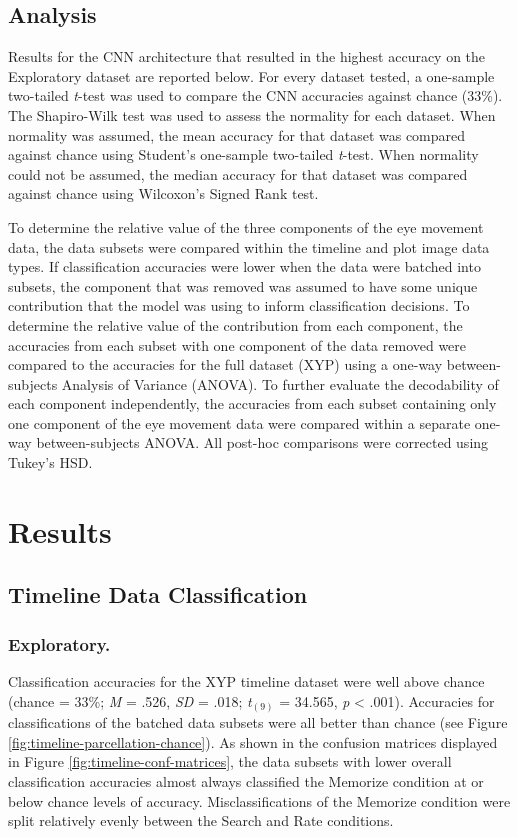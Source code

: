 \documentclass[
  english,
  man,floatsintext]{apa6}
\begin{document}
\subsection{Analysis}

Results for the CNN architecture that resulted in the highest accuracy on the Exploratory dataset are reported below. For every dataset tested, a one-sample two-tailed \emph{t}-test was used to compare the CNN accuracies against chance (33\%). The Shapiro-Wilk test was used to assess the normality for each dataset. When normality was assumed, the mean accuracy for that dataset was compared against chance using Student's one-sample two-tailed \emph{t}-test. When normality could not be assumed, the median accuracy for that dataset was compared against chance using Wilcoxon's Signed Rank test.

To determine the relative value of the three components of the eye movement data, the data subsets were compared within the timeline and plot image data types. If classification accuracies were lower when the data were batched into subsets, the component that was removed was assumed to have some unique contribution that the model was using to inform classification decisions. To determine the relative value of the contribution from each component, the accuracies from each subset with one component of the data removed were compared to the accuracies for the full dataset (XYP) using a one-way between-subjects Analysis of Variance (ANOVA). To further evaluate the decodability of each component independently, the accuracies from each subset containing only one component of the eye movement data were compared within a separate one-way between-subjects ANOVA. All post-hoc comparisons were corrected using Tukey's HSD.

\section{Results}
\subsection{Timeline Data Classification}
\subsubsection{Exploratory.}

Classification accuracies for the XYP timeline dataset were well above chance (chance = 33\%; \emph{M} = .526, \emph{SD} = .018; \emph{t}\(_{(9)}\) = 34.565, \emph{p} \textless{} .001). Accuracies for classifications of the batched data subsets were all better than chance (see Figure \ref{fig:timeline-parcellation-chance}). As shown in the confusion matrices displayed in Figure \ref{fig:timeline-conf-matrices}, the data subsets with lower overall classification accuracies almost always classified the Memorize condition at or below chance levels of accuracy. Misclassifications of the Memorize condition were split relatively evenly between the Search and Rate conditions.
\end{document}
